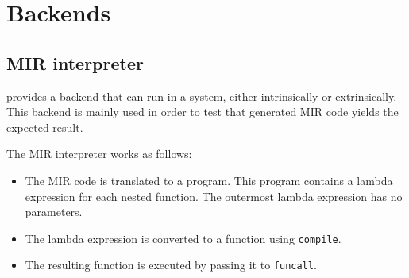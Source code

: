 \chapter{Backends}

\section{MIR interpreter}

\sysname{} provides a backend that can run in a \commonlisp{} system,
either intrinsically or extrinsically.  This backend is mainly used
in order to test that generated MIR code yields the expected result. 

The MIR interpreter works as follows:

\begin{itemize}
\item The MIR code is translated to a \commonlisp{} program.  This
  program contains a lambda expression for each nested function.  The
  outermost lambda expression has no parameters.
\item The lambda expression is converted to a function using
  \texttt{compile}. 
\item The resulting function is executed by passing it to
  \texttt{funcall}. 
\end{itemize}

